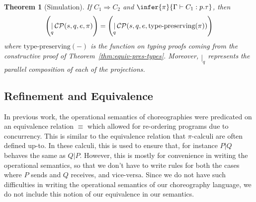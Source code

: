 \documentclass{article}
\newtheorem{thm}{Theorem}
\theoremstyle{definition}
\newcommand{\To}{\Rightarrow}
\newcommand{\proves}{\vdash}
\begin{document}
\begin{thm}[Simulation]
  \label{thm:simulation}
  If $C_1 \To C_2$ and $\infer{\pi}{\Gamma \proves C_1 : p.\tau}$, then $$\left(\mathop{|}_{q}\mathcal{C}\mathcal{P}(s, q, e, \pi)\right) = \left(\mathop{|}_{q}\mathcal{C}\mathcal{P}(s, q, e, \text{type-preserving}(\pi))\right)$$
  where $\text{type-preserving}(-)$ is the function on typing proofs coming from the constructive proof of Theorem~\ref{thm:equiv-pres-types}.
  Moreover, $\mathop{|}_{q}$ represents the parallel composition of each of the projections.
\end{thm}

\iffalse
\subsection{Refinement and Equivalence}

In previous work, the operational semantics of choreographies were predicated on an equivalence relation $\equiv$ which allowed for re-ordering programs due to concurrency.
This is similar to the equivalence relation that $\pi$-calculi are often defined up-to.
In these calculi, this is used to ensure that, for instance $P|Q$ behaves the same as $Q|P$.
However, this is mostly for convenience in writing the operational semantics, so that we don't have to write rules for both the cases where $P$ sends and $Q$ receives, and vice-versa.
Since we do not have such difficulties in writing the operational semantics of our choreography language, we do not include this notion of our equivalence in our semantics.
\end{document}

